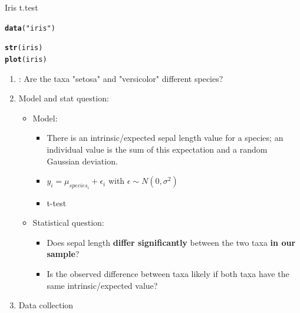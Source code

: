 \documentclass[10pt]{beamer}\usepackage[]{graphicx}\usepackage[]{color}
\makeatletter
\newcommand{\hlstr}[1]{\textcolor[rgb]{0.192,0.494,0.8}{#1}}%
\newcommand{\hlstd}[1]{\textcolor[rgb]{0.345,0.345,0.345}{#1}}%
\newcommand{\hlkwd}[1]{\textcolor[rgb]{0.737,0.353,0.396}{\textbf{#1}}}%
\newenvironment{kframe}{%
 \def\at@end@of@kframe{}%
 \ifinner\ifhmode%
  \def\at@end@of@kframe{\end{minipage}}%
  \begin{minipage}{\columnwidth}%
 \fi\fi%
 \def\FrameCommand##1{\hskip\@totalleftmargin \hskip-\fboxsep
 \colorbox{shadecolor}{##1}\hskip-\fboxsep
     \hskip-\linewidth \hskip-\@totalleftmargin \hskip\columnwidth}%
 \MakeFramed {\advance\hsize-\width
   \@totalleftmargin\z@ \linewidth\hsize
   \@setminipage}}%
 {\par\unskip\endMakeFramed%
 \at@end@of@kframe}
\newenvironment{knitrout}{}{} %
\makeatother
\begin{document}
\begin{frame}[fragile]{Iris t.test}
  
  \pause
\begin{knitrout}
\color{fgcolor}\begin{kframe}
\begin{alltt}
  \hlkwd{data}\hlstd{(}\hlstr{"iris"}\hlstd{)}
\end{alltt}
\end{kframe}
\end{knitrout}

\begin{knitrout}
\color{fgcolor}\begin{kframe}
\begin{alltt}
  \hlkwd{str}\hlstd{(iris)}
  \hlkwd{plot}\hlstd{(iris)}
\end{alltt}
\end{kframe}
\end{knitrout}
  
  \begin{enumerate}
    \item \color{red}{Scientific question}: Are the taxa "setosa" and "versicolor" different species?
  \pause
    \item Model and stat question:
      \begin{itemize}
        \item Model:
          \begin{itemize}
            \item There is an intrinsic/expected sepal length value for a species; an individual value is the sum of this expectation and a random Gaussian deviation.
            \item $y_i = \mu_{species_i} + \epsilon_i$ with  $\epsilon \sim N(0,\sigma^2)$
            \item t-test
          \end{itemize}
        \pause
        \item Statistical question: 
          \begin{itemize}
            \item Does sepal length \textbf{differ significantly} between the two taxa \textbf{in our sample}?
            \item Is the observed difference between taxa likely if both taxa have the same intrinsic/expected value?
          \end{itemize}
        \end{itemize}
      \item Data collection
    \end{enumerate}
\end{frame}
\end{document}
